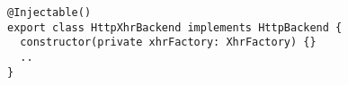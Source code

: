 \begin{verbatim}
@Injectable()
export class HttpXhrBackend implements HttpBackend {
  constructor(private xhrFactory: XhrFactory) {}
  ..
}
\end{verbatim}
